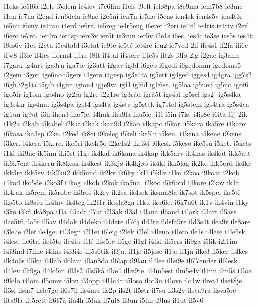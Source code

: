 {i1eks
ie5l6a
i2ele
i5elem
ie4lev
i7e6lim
i1els
i9elt
ielø8pa
i8e9ma
iem7b8
ie3me
i1en
ie7na
i2end
ien6dela
ie8né
i2e5ni
ien7n
ie5no
i5ens
ien4sk
ien4s5v
ien4t3r
ie5nu
i6eny
ie4ran
i4erd
ie6re.
ie5reg
ie4r5eng
i6eret
i2eri
ie4ril
ie4ris
ie4riv
i2erl
i6ero
ie7ro.
ier4ra
ier4sp
iers3v
ier5t
ie3run
ier5v
i2e1s
i6es.
ies4c
ie3se
ies5s
ies4ti
i8es6v
i1et
i2eta
i5e4tabl
i3etat
ie9te
ie5té
iet4re
ieu2
ie7ved
2if
ife4s1
if2fa
ifi6e
ifjø8
if3le
if4les
iform4
if1re
i8ft
if4tal
if4tere
ifte5s
ift2s
i3fø
2ig
i2gae
ig3ann
i7gark
ig4art
iga3ru
iga7te
ig3att
i2gav
ig3d
i6geb
i6gedi
i6gedomm
igedoms5
i2gem
i3gen
ige6no
i5gers
i4gerø
i4gesp
ig3e4ta
ig5ett
ig4ged
igges4
ig4gra
igg7s2
i6gh
i2g1ia
i5gib
i4gim
igion4
igje9va
ig1l
igl6d
igli6se.
ig5loa
ig5neu
ig5no
igof6
igo5fr
ig1om
igo4no
ig2ra
ig2re
i2g1rø
ig3råd
igrå5t
igs4al
ig5sel
igs2j
ig5s4ka
ig3s4kr
igs4mu
ig3s4pa
igst4
igs4ta
ig4ste
ig5stek
ig7stel
ig5stem
igs4tra
ig5s4va
ig1un
ig9ut
i3h
ihen3
iho7le.
i4huk
ihu9la
ihu5le.
i1i
i5in
i7is.
i4is8e
i6ita
i1j
2ik
i1k2a
i2kab
i5kabel
i2kaf
i2kak
ikan9d
i2kao
i4kapo
i5kar.
i5kara
ika5re
i4karei
i6kasa
ika3sp
i2ke.
i2ked
ik8ei
i9keleg
i5keli
ike5lu
i5ken.
i4kena
i5kene
i9kens
i3ker.
i4kera
i5kere.
ike5ri
ike4r5o
i2ke1s2
ike3si
i6kesk
i5keso
ike5su
i5ket.
i5kets
i1ki
iki9ne
ik5inn
iki5st
i1kj
ik4kaf
ik6kana
ik4kap
ikk5arv
ik4kas
ik4kat
ikk5att
ik6k7ent
ik4keru
ik8kesk
ik4kest
ik3kjø
ik4kjøp
ik4kl
ikk5lag
ik2ko
ikk5ord
ik4kr
ikk3re
ikk5sv
4ik2ku2
ikk5und
ik2kv
ik6ky
ik1l
i5klæ
i1ko
i2koa
i9koar
i2kob
i4kod
iko5de
i2ko3f
i4kog
i4koh
i2kok
iko5na.
i2koo
i5k6ord
i4kore
i2kov
ik1r
ik4rak
ik5rem
ik5robe
ik3ros
ik2ry
ik2sa
ik4sek
iksmå8la
ik7sot
ik5spel
iks5ti
iks5to
ik8stu
ik4tav
ik4teg
ik2t1r
iktsla8ga
i1ku
iku6le.
i6k7u6t
ik1v
ik4vin
i1ky
i3kø
i3kå
ikå8pa
i1la
il5adr
il7af
i2l3ak
il3al
i4lana
il6and
i4lark
il3art
il5ass
ilas5t6
ila5t
il5av
il4dak
il4deko
il4dete
il7dj
ild3re
ildsfa9re
ild3s4t
ilea9r
ile8are
i3le7e
i2lef
ile4ge.
i4l3egn
i2l1ei
i6leig
i2lek
i2lel
i4leno
i4lero
ile1s
i4lese
i4le5sk
i4lest
ile6tri
ilet5te
ile4tu
i1lé
ilfø5re
il5ge
il1gl
i4lid
ili5ers
ili9ga
i5lik
i2l1im
i4l3ind
i7line
i4lins
i4l3i4r
ili5s6tik
il3ja.
il1je
il5jese
il1jo
il1ju
ilke3
il5ker
il4kes
ilk4o6s
il5ku
il4lab
il6lam
illan8da
il6lap
il9lau
il4lee
illei9e
il6l7ender
il6lesk
il4lev
illi9ga
il4lo5m
ill3s2
ills5kå
illæ4
illæ9re.
il4m5est
ilm5e4v
il4mi
ilm5s
i1loe
i9lolo
i4lom
il5omv
i5lon
il3opp
i4l1o4r
i5loso
ilot3u
i4love
ilo1w
ilret4
ilset8je
il3sl
ilsla7
ilsle7ge
il6s7li
ils4mu
ils2p
ils2t
il5str
il7su
il3s2v
ilsva9ra
ilsva5re
ilta9la
ilt5rett
il6t7å
ilu4h
i5luk
il7ul8
il3un
i5lur
i9lus
il1ut
il5v6
}
